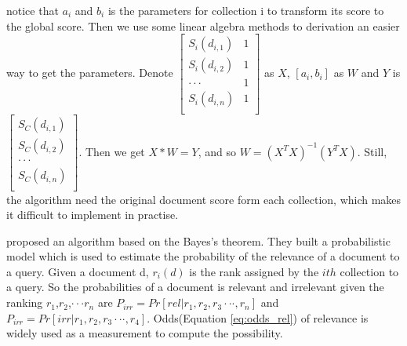 notice that $a_i$ and $b_i$ is the parameters for collection i to transform its score to the global score. Then we use some linear algebra methods to derivation an easier way to get the parameters. Denote $\begin{bmatrix}
       S_i(d_{i,1})& 1           \\[0.3em]
       S_i(d_{i,2})& 1           \\[0.3em]
       \cdotp\cdotp\cdotp   &1        \\[0.3em]
       S_i(d_{i,n})& 1           \\[0.3em]
     \end{bmatrix}$ as $X$, $[a_i,b_i]$ as $W$ and $Y$ is $    \begin{bmatrix}
       S_C(d_{i,1})           \\[0.3em]
       S_C(d_{i,2})           \\[0.3em]
       \cdotp\cdotp\cdotp         \\[0.3em]
       S_C(d_{i,n})           \\[0.3em]
     \end{bmatrix}$. Then we get $X*W=Y$, and so $W=(X^TX)^{-1}(Y^TX)$. Still, the algorithm need the original document score form each collection, which makes it difficult to implement in practise.
     
\cite{Aslam2001} proposed an algorithm based on the Bayes's theorem. They built a probabilistic model which is used to estimate the probability of the relevance of a document to a query. Given a document d,
$r_i(d)$ is the rank assigned by the $ith$ collection to a query. So the probabilities of a document is relevant and irrelevant given the ranking {$r_1$,$r_2$,$\cdotp\cdotp\cdotp$$r_n$} are
$P_{irr}=Pr[rel|r_1,r_2,r_3\cdotp\cdotp\cdotp,r_n]$ 
and
$P_{irr}=Pr[irr|r_1,r_2,r_3\cdotp\cdotp\cdotp,r_4]$. 
Odds(Equation \eqref{eq:odds_rel}) of relevance is widely used as a measurement to compute the possibility.

